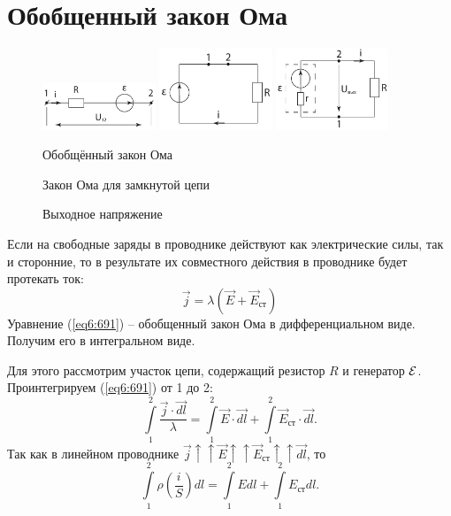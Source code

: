 \section{Обобщенный закон Ома}
    \begin{figure}[b!]
        \center
        \includegraphics[width=0.3\textwidth]{lec06/generic_ohm.pdf}
        \hfill
        \includegraphics[width=0.3\textwidth]{lec06/closed_g_o.pdf}
        \hfill
        \includegraphics[width=0.3\textwidth]{lec06/U_ext.pdf}
        \parbox[t]{.3\textwidth}{\caption{Обобщённый закон Ома}}
        \hfill
        \parbox[t]{.3\textwidth}{\caption{Закон Ома для замкнутой цепи}}
        \hfill
        \parbox[t]{.3\textwidth}{\caption{Выходное напряжение}}
    \end{figure}
    Если на свободные заряды в проводнике действуют как электрические силы,
    так и сторонние, то в результате их совместного действия в проводнике будет
    протекать ток:
    \begin{equation}
        \vec{j} = \lambda (\vec{E} + \vec{E}_{\textit{ст}})
        \label{eq6:691}
    \end{equation}
    Уравнение (\ref{eq6:691}) -- обобщенный закон Ома в дифференциальном виде.
    Получим его в интегральном виде.

    Для этого рассмотрим участок цепи, содержащий резистор \( R \) и генератор
    \( \mathcal{E} \). Проинтегрируем (\ref{eq6:691}) от 1 до 2:
    \[
        \int\limits_1^2 \frac{\vec{j}\cdot\vec{dl}}{\lambda} =
        \int\limits_1^2 \vec{E}\cdot\vec{dl} + \int\limits_1^2 
        \vec{E}_{\textit{ст}}\cdot\vec{dl}.
    \]
    Так как в линейном проводнике \( \vec{j} \uparrow\uparrow \vec{E}
    \uparrow\uparrow  \vec{E}_{\textit{ст}} \uparrow\uparrow \vec{dl} \), то
    \[
        \int\limits_1^2 \rho \left( \frac{i}{S} \right)dl =
        \int\limits_1^2 Edl + \int\limits_1^2 E_{\textit{ст}} dl.
    \]
    

